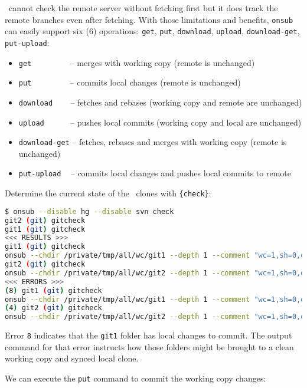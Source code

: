 \Git\ cannot check the remote server without fetching first but it does track the remote branches even after fetching. With those limitations and benefits, \lstinline{onsub} can easily support six (6) operations: \lstinline{get}, \lstinline{put}, \lstinline{download}, \lstinline{upload}, \lstinline{download-get}, \lstinline{put-upload}:

\begin{itemize}
\item \lstinline{get} ~~~~~~~~ -- merges with working copy (remote is unchanged)
\item \lstinline{put} ~~~~~~~~ -- commits local changes (remote is unchanged)
\item \lstinline{download} ~~~ -- fetches and rebases (working copy and remote are unchanged)
\item \lstinline{upload} ~~~~~ -- pushes local commits (working copy and local are unchanged)
\item \lstinline{download-get} -- fetches, rebases and merges with working copy (remote is unchanged)
\item \lstinline{put-upload} ~ -- commits local changes and pushes local commits to remote
\end{itemize}

Determine the current state of the \Git\ clones with \lstinline|{check}|:

\begin{snugshade}
\begin{lstlisting}[language=bash]	
$ onsub --disable hg --disable svn check
git2 (git) gitcheck
git1 (git) gitcheck
<<< RESULTS >>>
git1 (git) gitcheck
onsub --chdir /private/tmp/all/wc/git1 --depth 1 --comment "wc=1,sh=0,out=0,in=0" {put}
git2 (git) gitcheck
onsub --chdir /private/tmp/all/wc/git2 --depth 1 --comment "wc=1,sh=0,out=1,in=0" {put-upload}
<<< ERRORS >>>
(8) git1 (git) gitcheck
onsub --chdir /private/tmp/all/wc/git1 --depth 1 --comment "wc=1,sh=0,out=0,in=0" {put}
(4) git2 (git) gitcheck
onsub --chdir /private/tmp/all/wc/git2 --depth 1 --comment "wc=1,sh=0,out=1,in=0" {put-upload}
\end{lstlisting}
\end{snugshade}

Error \lstinline{8} indicates that the \lstinline{git1} folder has local changes to commit. The output command for that error instructs how those folders might be brought to a clean working copy and synced local clone.

We can execute the \lstinline{put} command to commit the working copy changes:

